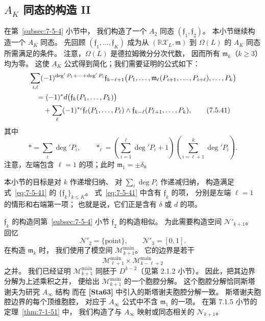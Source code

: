 
\subsection{$A_K$ 同态的构造 II}
\label{subsec:7-5-5}

在第~\ref{subsec:7-5-4} 小节中，
我们构造了一个 $A_2$ 同态
$(\mathfrak f_1,\mathfrak f_2)$。
本小节继续构造一个 $A_K$ 同态。
先回顾
$(\mathfrak f_1,\ldots,\mathfrak f_K)$
成为从 $(\mathbb R\mathcal X_L,\mathfrak m)$
到 $\Omega(L)$ 的 $A_K$ 同态所需满足的条件。
注意，$\Omega(L)$ 是德拉姆微分分次代数，
因而所有 $\mathfrak m_k$（$k\geq3$）均为零。
这使 $A_K$ 公式得到简化；我们需要证明的公式如下：
\begin{align}
&\sum_{i,\ell}
(-1)^{\deg'P_1+\cdots+\deg'P_i}
\mathfrak f_{k-\ell+1}
\bigl(P_1,\ldots,
 \mathfrak m_\ell(P_{i+1},\ldots,P_{i+\ell}),
 \ldots,P_k\bigr)
\notag\\
&\quad={}
(-1)^\ast d\bigl(\mathfrak f_k(P_1,\ldots,P_k)\bigr)
\notag\\
&\qquad
+\sum_\ell(-1)^{\ast_\ell}
\mathfrak f_\ell(P_1,\ldots,P_\ell)
\wedge
\mathfrak f_{k-\ell}(P_{\ell+1},\ldots,P_k),
\tag{7.5.41}\label{eq:7-5-41}
\end{align}
其中
\[
\ast=\sum_i\deg'P_i,
\qquad
\ast_\ell=
\left(\sum_{i=1}^{\ell}\deg'P_i+1\right)
\left(\sum_{i=\ell+1}^{k}\deg'P_i\right).
\]
注意，左端包含 $\ell=1$ 的项；此时
$\mathfrak m_1=\pm\delta$。

本小节的目标是对 $k$ 作递增归纳、
对 $\sum_i\deg P_i$ 作递减归纳，
构造满足式~\eqref{eq:7-5-41} 的
$\{\mathfrak f_k\}_{k\leq K}$。
式~\eqref{eq:7-5-41} 中含有 $\mathfrak f_k$ 的项，
分别是左端 $\ell=1$ 的情形和右端第一项；
也就是说，它们正是含有 $\delta$ 或 $d$ 的项。

$\mathfrak f_k$ 的构造同第~\ref{subsec:7-5-4} 小节
$\mathfrak f_2$ 的构造相似。
为此需要构造空间 $\mathcal N'_{k+1}$。
回忆
\[
\mathcal N'_2=\{\mathrm{point}\},
\qquad
\mathcal N'_3=[0,1].
\]
在构造 $\mathfrak m_k$ 时，
我们使用了模空间 $\mathcal M_{k+1}^{\mathrm{main}}$。
它的边界是若干
\[
\mathcal M_{\ell+1}^{\mathrm{main}}
\times
\mathcal M_{k-\ell+2}^{\mathrm{main}}
\]
之并。
我们已经证明
$\mathcal M_{k+1}^{\mathrm{main}}$
同胚于 $D^{k-2}$（见第 2.1.2 小节）。
因此，把其边界分解为上述乘积之并，
便给出 $\mathcal M_{k+1}^{\mathrm{main}}$ 的一个胞腔分解。
这个胞腔分解恰同斯塔谢夫为研究 $A_\infty$ 结构
而在 \textbf{[Sta63]} 中引入的斯塔谢夫胞腔分解一致。
斯塔谢夫胞腔边界的每个顶维胞腔，
对应于 $A_\infty$ 公式中不含 $\mathfrak m_1$ 的一项。
在第 7.1.5 小节的定理~\ref{thm:7-1-51} 中，
我们构造了与 $A_\infty$ 映射或同态相关的
$\mathcal N_{k+1}$。

